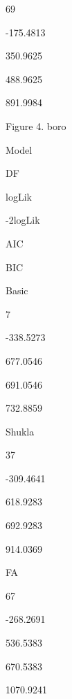 \documentclass[]{article}
\begin{document}
69

-175.4813

350.9625

488.9625

891.9984

Figure 4. boro

Model

DF

logLik

-2logLik

AIC

BIC

Basic

7

-338.5273

677.0546

691.0546

732.8859

Shukla

37

-309.4641

618.9283

692.9283

914.0369

FA

67

-268.2691

536.5383

670.5383

1070.9241
\end{document}
